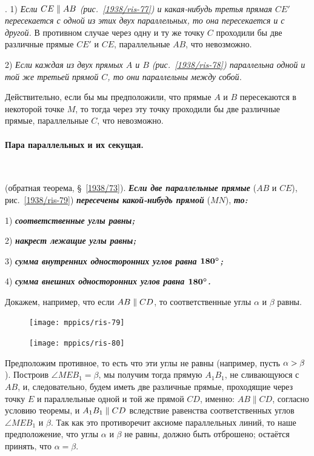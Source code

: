 \documentclass[twoside]{book}
\begin{document}
\paragraph{}\label{1938/76}
\mbox{.}
1) \emph{Если $CE\z\parallel AB$ \emph{(рис.~\ref{1938/ris-77})} и какая-нибудь третья прямая $CE'$ пересекается с одной из этих двух параллельных, то она пересекается и с другой.}
В противном случае через одну и ту же точку $C$ проходили бы две различные прямые $CE'$ и $CE$, параллельные $AB$, что невозможно.

2) \emph{Если каждая из двух прямых $A$ и $B$ \emph{(рис.~\ref{1938/ris-78})} параллельна одной и той же третьей прямой $C$, то они параллельны между собой.}

Действительно, если бы мы предположили, что прямые $A$ и $B$ пересекаются в некоторой точке $M$, то тогда через эту точку проходили бы две различные прямые, параллельные $C$, что невозможно.

\paragraph{Пара параллельных и их секущая.}\label{1938/77}\ 

\smallskip
{} (обратная теорема, §~\ref{1938/73}).
\textbf{\emph{Если две параллельные прямые}} ($AB$ и $CE$), рис.~\ref{1938/ris-79}) \textbf{\emph{пересечены какой-нибудь прямой}} ($MN$), \textbf{\emph{то:}}

1) \textbf{\emph{соответственные углы равны;}}

2) \textbf{\emph{накрест лежащие углы равны;}}

3) \textbf{\emph{сумма внутренних односторонних углов равна $\bm{180\degree}$;}}

4) \textbf{\emph{сумма внешних односторонних углов равна $\bm{180\degree}$.}}

Докажем, например, что если $AB\z\parallel CD$, то соответственные углы $\alpha$ и $\beta$ равны.

\begin{figure}
\centering
\texttt{[image: mppics/ris-79]}
\caption{}\label{1938/ris-79}
\bigskip
\texttt{[image: mppics/ris-80]}
\caption{}\label{1938/ris-80}
\end{figure}

Предположим противное, то есть что эти углы не равны (например, пусть $\alpha \z> \beta$).
Построив $\angle MEB_1 = \beta$, мы получим тогда прямую $A_1B_1$, не сливающуюся с $AB$, и, следовательно, будем иметь две различные прямые, проходящие через точку $E$ и параллельные одной и той же прямой $CD$, именно:
$AB\parallel CD$, согласно условию теоремы, и $A_1B_1\z\parallel CD$ вследствие равенства соответственных углов $\angle MEB_1$ и $ \beta$.
Так как это противоречит аксиоме параллельных линий, то наше предположение, что углы $\alpha$ и $\beta$ не равны, должно быть отброшено;
остаётся принять, что $ \alpha =  \beta$.
\end{document}
